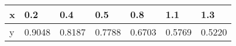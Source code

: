 \documentclass{article}
\begin{document}
\begin{table}[h!]
\begin{tabular}{lllllll}

\multicolumn{1}{p{30.865313pt}}{\raggedright x} & \multicolumn{1}{p{33.12375pt}}{\raggedright 0.2} & \multicolumn{1}{p{39.899063pt}}{\raggedright 0.4} & \multicolumn{1}{p{33.876564pt}}{\raggedright 0.5} & \multicolumn{1}{p{33.876564pt}}{\raggedright 0.8} & \multicolumn{1}{p{33.876564pt}}{\raggedright 1.1} & \multicolumn{1}{p{33.876564pt}}{\raggedright 1.3}\\ 
\hline 
\multicolumn{1}{p{30.865313pt}}{\raggedright y} & \multicolumn{1}{p{33.12375pt}}{\raggedright 0.9048} & \multicolumn{1}{p{39.899063pt}}{\raggedright 0.8187} & \multicolumn{1}{p{33.876564pt}}{\raggedright 0.7788} & \multicolumn{1}{p{33.876564pt}}{\raggedright 0.6703} & \multicolumn{1}{p{33.876564pt}}{\raggedright 0.5769} & \multicolumn{1}{p{33.876564pt}}{\raggedright 0.5220}\\ 


\end{tabular}
\end{table}
\end{document}

